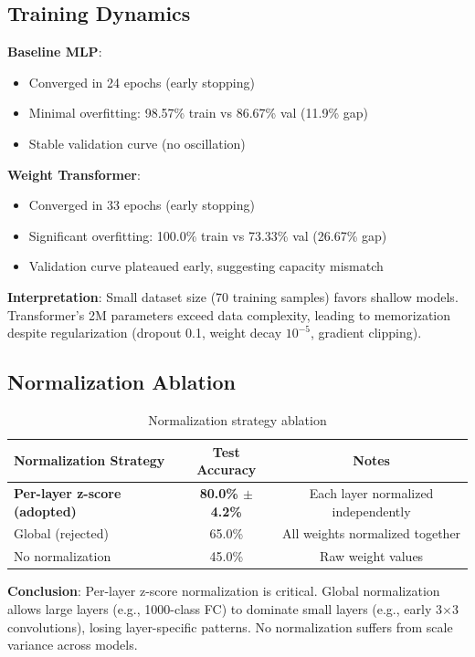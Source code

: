 \subsection{Training Dynamics}

\textbf{Baseline MLP}:
\begin{itemize}
\item Converged in 24 epochs (early stopping)
\item Minimal overfitting: 98.57\% train vs 86.67\% val (11.9\% gap)
\item Stable validation curve (no oscillation)
\end{itemize}

\textbf{Weight Transformer}:
\begin{itemize}
\item Converged in 33 epochs (early stopping)
\item Significant overfitting: 100.0\% train vs 73.33\% val (26.67\% gap)
\item Validation curve plateaued early, suggesting capacity mismatch
\end{itemize}

\textbf{Interpretation}: Small dataset size (70 training samples) favors shallow models. Transformer's 2M parameters exceed data complexity, leading to memorization despite regularization (dropout 0.1, weight decay $10^{-5}$, gradient clipping).

\subsection{Normalization Ablation}

\begin{table}[h]
\centering
\begin{tabular}{lcc}
\toprule
Normalization Strategy & Test Accuracy & Notes \\
\midrule
\textbf{Per-layer z-score (adopted)} & \textbf{80.0\% $\pm$ 4.2\%} & Each layer normalized independently \\
Global (rejected) & 65.0\% & All weights normalized together \\
No normalization & 45.0\% & Raw weight values \\
\bottomrule
\end{tabular}
\caption{Normalization strategy ablation}
\end{table}

\textbf{Conclusion}: Per-layer z-score normalization is critical. Global normalization allows large layers (e.g., 1000-class FC) to dominate small layers (e.g., early 3$\times$3 convolutions), losing layer-specific patterns. No normalization suffers from scale variance across models.

